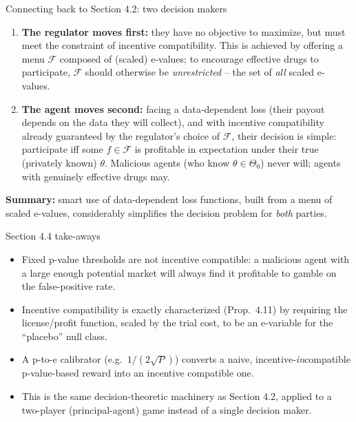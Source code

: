 \documentclass[aspectratio=169,10pt]{beamer}
\begin{document}
\begin{frame}{Connecting back to Section 4.2: two decision makers}
  \begin{enumerate}
    \item \textbf{The regulator moves first:} they have no objective to
    maximize, but must meet the constraint of incentive compatibility. This
    is achieved by offering a menu $\mathcal F$ composed of (scaled)
    e-values; to encourage effective drugs to participate, $\mathcal F$
    should otherwise be \emph{unrestricted} -- the set of \emph{all} scaled
    e-values.
    \item \textbf{The agent moves second:} facing a data-dependent loss
    (their payout depends on the data they will collect), and with
    incentive compatibility already guaranteed by the regulator's choice of
    $\mathcal F$, their decision is simple: participate iff some $f\in\mathcal F$
    is profitable in expectation under their true (privately known)
    $\theta$. Malicious agents (who know $\theta\in\Theta_0$) never will;
    agents with genuinely effective drugs may.
  \end{enumerate}
  \textbf{Summary:} smart use of data-dependent loss functions, built from a
  menu of scaled e-values, considerably simplifies the decision problem for
  \emph{both} parties.
\end{frame}

\begin{frame}{Section 4.4 take-aways}
  \begin{itemize}
    \item Fixed p-value thresholds are not incentive compatible: a
    malicious agent with a large enough potential market will always find
    it profitable to gamble on the false-positive rate.
    \item Incentive compatibility is exactly characterized (Prop.\ 4.11) by
    requiring the license/profit function, scaled by the trial cost, to be
    an e-variable for the ``placebo'' null class.
    \item A p-to-e calibrator (e.g.\ $1/(2\sqrt P)$) converts a naive,
    incentive-\emph{in}compatible p-value-based reward into an incentive
    compatible one.
    \item This is the same decision-theoretic machinery as Section 4.2,
    applied to a two-player (principal-agent) game instead of a single
    decision maker.
  \end{itemize}
\end{frame}
\end{document}
